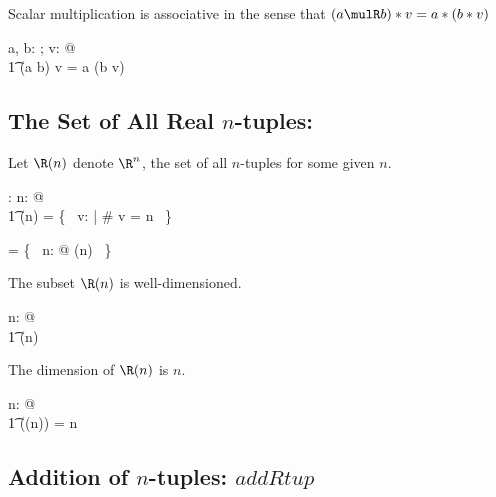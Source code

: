\documentclass{amsart}
\begin{document}
\begin{remark}
Scalar multiplication is associative in the sense that $(a \mulR b) \smulRinf v = a \smulRinf (b \smulRinf v)$

\begin{zed}
	\forall a, b: \R; v: \Rinf @ \\
	\t1	(a \mulR b) \smulRinf v = a \smulRinf (b \smulRinf v)
\end{zed}

\end{remark}

\subsection{The Set of All Real $n$-tuples: }

Let $\Rtup(n)$ denote $\R^n$, the set of all $n$-tuples for some given $n$.
\begin{axdef}
	\Rtup: \nat \fun \power \Rinf
\where
	\forall n: \nat @ \\
	\t1	\Rtup(n) = \{~ v: \Rinf | \# v = n ~\}
\end{axdef}

\begin{remark}

\begin{zed}
	\Rinf = \bigcup \{~ n: \nat @ \Rtup(n) ~\}
\end{zed}

\end{remark}

\begin{remark}
The subset $\Rtup(n)$ is well-dimensioned.

\begin{zed}
	\forall n: \nat @ \\
	\t1	\Rtup(n) \in \DeltaRinf
\end{zed}

\end{remark}

\begin{remark}
The dimension of $\Rtup(n)$ is $n$.

\begin{zed}
	\forall n: \nat @ \\
	\t1	\dimRinf(\Rtup(n)) = n
\end{zed}

\end{remark}

\subsection{Addition of $n$-tuples: $addRtup$}
\end{document}
